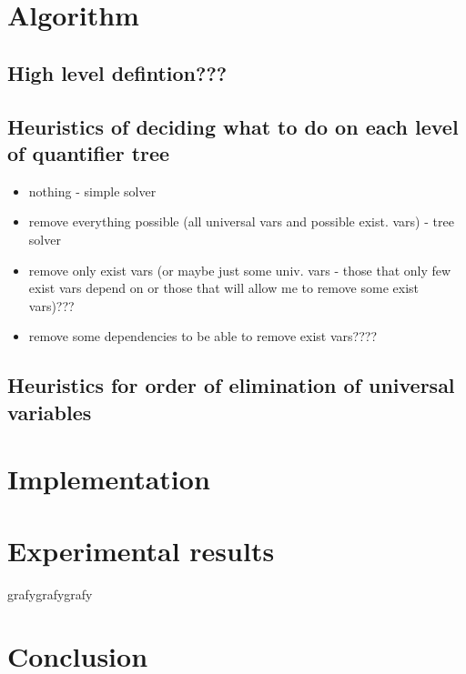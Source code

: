 \documentclass[
  digital, %
  twoside, %
  table,   %
  nolof,     %
  nolot,     %
]{fithesis3}
\theoremstyle{definition}
\theoremstyle{remark}
\begin{document}
\chapter{Algorithm}

\section{High level defintion???}

\section{Heuristics of deciding what to do on each level of quantifier tree}
\begin{itemize}
    \item nothing - simple solver
    \item remove everything possible (all universal vars and possible exist. vars) - tree solver
    \item remove only exist vars (or maybe just some univ. vars - those that only few exist vars depend on or those that will allow me to remove some exist vars)???
    \item remove some dependencies to be able to remove exist vars????
\end{itemize}

\section{Heuristics for order of elimination of universal variables}

\chapter{Implementation}

\chapter{Experimental results}
grafygrafygrafy

\chapter*{Conclusion}

\printbibliography[heading=bibintoc]

\end{document}
